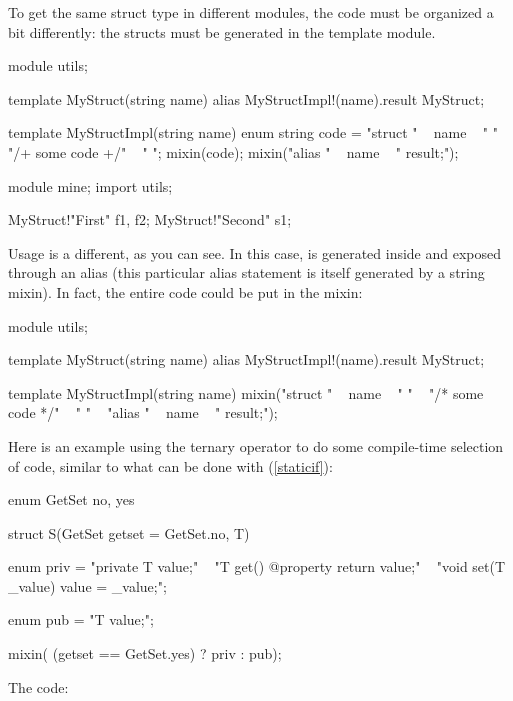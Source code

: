 To get the same struct type in different modules, the code must be organized a bit differently: the structs must be generated in the template module.

\begin{dcode}
module utils;

template MyStruct(string name)
{
    alias MyStructImpl!(name).result MyStruct;
}

template MyStructImpl(string name)
{    
    enum string code = "struct " ~ name 
                     ~ " { "
                     ~ "/+ some code +/"
                     ~ " }";
    mixin(code);
    mixin("alias " ~ name ~ " result;");
}
\end{dcode}

\begin{dcode}
module mine;
import utils;

MyStruct!"First" f1, f2;
MyStruct!"Second" s1;
\end{dcode}

Usage is a different, as you can see. In this case,  is generated inside  and exposed through an alias (this particular alias statement is itself generated by a string mixin). In fact, the entire code could be put in the mixin:

\begin{dcode}
module utils;

template MyStruct(string name)
{
    alias MyStructImpl!(name).result MyStruct;
}

template MyStructImpl(string name)
{
mixin("struct " ~ name 
    ~ " {"
    ~ "/* some code */"
    ~ " }\n"
    ~ "alias " ~ name ~ " result;");
}
\end{dcode}

Here is an example using the ternary  operator to do some compile-time selection of code, similar to what can be done with  (\ref{staticif}):

\begin{dcode}
enum GetSet { no, yes}

struct S(GetSet getset = GetSet.no, T)
{
    enum priv = "private T value;\n"
              ~ "T get() @property { return value;}\n"
              ~ "void set(T _value) { value = _value;}";

    enum pub = "T value;";

    mixin( (getset == GetSet.yes) ? priv : pub);
}
\end{dcode}

The code:

